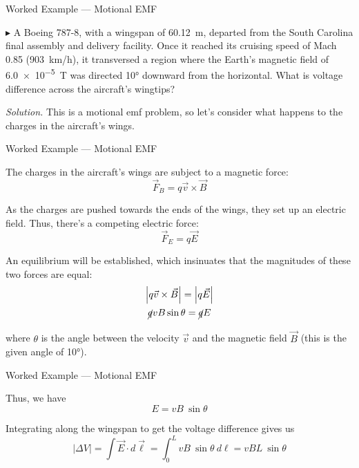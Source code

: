 \documentclass{beamer}
\begin{document}
\begin{frame}{Worked Example --- Motional EMF}

$\blacktriangleright$ A Boeing 787-8, with a wingspan of \SI{60.12}{\metre}, departed from the South Carolina final assembly and delivery facility. Once it reached its cruising speed of Mach 0.85 (\SI{903}{\kilo\metre/\hour}), it transversed a region where the Earth's magnetic field of \SI{6.0e-5}{\tesla} was directed \ang{10} downward from the horizontal. What is voltage difference across the aircraft's wingtips?

\vfill

\textit{Solution.} This is a motional emf problem, so let's consider what happens to the charges in the aircraft's wings.

\end{frame}

\begin{frame}{Worked Example --- Motional EMF}

The charges in the aircraft's wings are subject to a magnetic force:
\begin{equation*}
    \vec{F}_B = q\vec{v} \times \vec{B}
\end{equation*}

As the charges are pushed towards the ends of the wings, they set up an electric field. Thus, there's a competing electric force:
\begin{equation*}
    \vec{F}_E = q\vec{E}
\end{equation*}

An equilibrium will be established, which insinuates that the magnitudes of these two forces are equal:
\begin{gather*}
    \left| q\vec{v} \times \vec{B} \right| = \left| q\vec{E} \right| \\
    \cancel{q} v B \sin{\theta} = \cancel{q} E
\end{gather*}

where $\theta$ is the angle between the velocity $\vec{v}$ and the magnetic field $\vec{B}$ (this is the given angle of \ang{10}).

\end{frame}

\begin{frame}{Worked Example --- Motional EMF}

Thus, we have
\begin{equation*}
    E = vB\ \sin{\theta}
\end{equation*}

Integrating along the wingspan to get the voltage difference gives us
\begin{equation*}
    \left| \Delta V \right| = \int \vec{E} \cdot d\vec{\ell} = \int_{0}^{L} vB\ \sin{\theta}\ d\ell = vBL\ \sin{\theta}
\end{equation*}

\end{frame}
\end{document}
